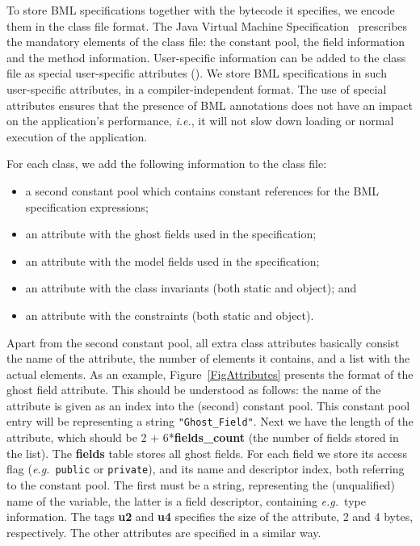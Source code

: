 To store BML specifications together with the bytecode it specifies,
we encode them in the class file format. The Java Virtual Machine
Specification~\cite{JVMspec} prescribes the mandatory elements of the
class file: the constant pool, the field information and the method
information. User-specific information can be added to the class file
as special user-specific attributes (\cite[\S4.7.1]{JVMspec}).  We
store BML specifications in such user-specific attributes, in a
compiler-independent format. The use of special attributes ensures
that the presence of BML annotations does not have an impact on the
application's performance, \emph{i.e.}, it will not slow down loading
or normal execution of the application.

For each class, we add the following information to the class file:
\begin{itemize}
\item a second constant pool which contains constant references
      for the BML specification expressions;
\item an attribute with the ghost fields used in the specification;
\item an attribute with the model fields used in the specification;
\item an attribute with the class invariants (both static and object); and
\item an attribute with the constraints (both static and object).
\end{itemize}
Apart from the second constant pool, all extra class attributes
basically consist the name of the attribute, the number of elements it
contains, and a list with the actual elements.  As an example,
Figure~\ref{FigAttributes} presents the format of the ghost field
attribute. This should be understood as follows: the name of the
attribute is given as an index into the (second) constant pool. This
constant pool entry will be representing a string
\texttt{"Ghost\_Field"}. Next we have the length of the attribute,
which should be 2 + 6*\textbf{fields\_count} (the number of fields
stored in the list). The \textbf{fields} table stores all ghost
fields. For each field we store its access flag (\emph{e.g.}\
\texttt{public} or
\texttt{private}), and its name and descriptor index, both
referring to the constant pool. The first must be a string,
representing the (unqualified) name of the variable, the latter is a
field descriptor, containing \emph{e.g.}\ type information.  The tags
\textbf{u2} and \textbf{u4} specifies the size of the attribute, 2 and
4 bytes, respectively. The other attributes are specified in a similar
way.



